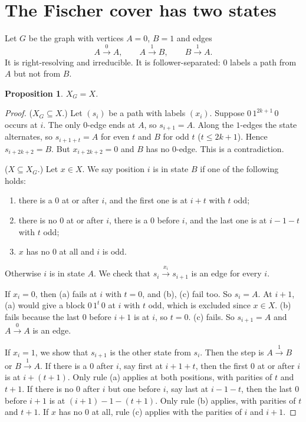 \documentclass[11pt]{article}
\newtheorem{proposition}[theorem]{Proposition}
\theoremstyle{definition}
\theoremstyle{remark}
\begin{document}
\section{The Fischer cover has two states}

Let $G$ be the graph with vertices $A=0$, $B=1$ and edges
\[
A\xrightarrow{0}A,\qquad A\xrightarrow{1}B,\qquad B\xrightarrow{1}A.
\]
It is right-resolving and irreducible. It is follower-separated: $0$ labels a
path from $A$ but not from $B$.

\begin{proposition}\label{prop:presents}
$X_G=X$.
\end{proposition}
\begin{proof}
($X_G\subseteq X$.) Let $(s_i)$ be a path with labels $(x_i)$. Suppose
$0\,1^{2k+1}\,0$ occurs at $i$. The only $0$-edge ends at $A$, so
$s_{i+1}=A$. Along the $1$-edges the state alternates, so
$s_{i+1+t}=A$ for even $t$ and $B$ for odd $t$ ($t\le 2k+1$). Hence
$s_{i+2k+2}=B$. But $x_{i+2k+2}=0$ and $B$ has no $0$-edge. This is a contradiction.

($X\subseteq X_G$.) Let $x\in X$. We say position $i$ is in state $B$ if one of
the following holds:
\begin{enumerate}
\item[(a)] there is a $0$ at or after $i$, and the first one is at $i+t$ with $t$ odd;
\item[(b)] there is no $0$ at or after $i$, there is a $0$ before $i$, and the
last one is at $i-1-t$ with $t$ odd;
\item[(c)] $x$ has no $0$ at all and $i$ is odd.
\end{enumerate}
Otherwise $i$ is in state $A$. We check that $s_i\xrightarrow{x_i}s_{i+1}$ is an edge for every $i$.

If $x_i=0$, then (a) fails at $i$ with $t=0$, and (b), (c) fail too. So $s_i=A$.
At $i+1$, (a) would give a block $0\,1^{t}\,0$ at $i$ with $t$ odd, which is
excluded since $x\in X$. (b) fails because the last $0$ before $i+1$ is at
$i$, so $t=0$. (c) fails. So $s_{i+1}=A$ and $A\xrightarrow{0}A$ is an edge.

If $x_i=1$, we show that $s_{i+1}$ is the other state from $s_i$. Then the step
is $A\xrightarrow1B$ or $B\xrightarrow1A$. If there is a $0$ after $i$, say
first at $i+1+t$, then the first $0$ at or after $i$ is at $i+(t+1)$. Only
rule (a) applies at both positions, with parities of $t$ and $t+1$. If there is
no $0$ after $i$ but one before $i$, say last at $i-1-t$, then the last $0$
before $i+1$ is at $(i+1)-1-(t+1)$. Only rule (b) applies, with parities of $t$
and $t+1$. If $x$ has no $0$ at all, rule (c) applies with the parities of $i$
and $i+1$.
\end{proof}
\end{document}
